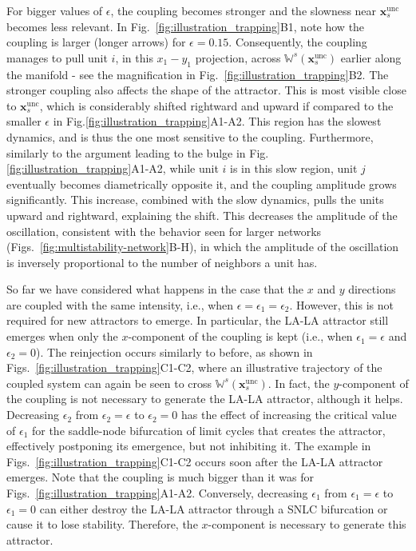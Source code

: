 For bigger values of $\epsilon$, the coupling becomes stronger and the slowness near $\mathbf{x}_s^\mathrm{unc}$ becomes less relevant. In Fig.~\ref{fig:illustration_trapping}B1, note how the coupling is larger (longer arrows) for $\epsilon = 0.15$. Consequently, the coupling manages to pull unit $i$, in this $x_1-y_1$ projection, across $\mathbb{W}^s(\mathbf{x}_s^\mathrm{unc})$ earlier along the manifold - see the magnification in Fig.~\ref{fig:illustration_trapping}B2. 
The stronger coupling also affects the shape of the attractor. This is most visible close to $\mathbf{x}_s^\mathrm{unc}$, which is considerably shifted rightward and upward if compared to the smaller $\epsilon$ in Fig.\ref{fig:illustration_trapping}A1-A2. This region has the slowest dynamics, and is thus the one most sensitive to the coupling. Furthermore, similarly to the argument leading to the bulge in Fig.\ref{fig:illustration_trapping}A1-A2, while unit $i$ is in this slow region, unit $j$ eventually becomes diametrically opposite it, and the coupling amplitude grows significantly. This increase, combined with the slow dynamics, pulls the units upward and rightward, explaining the shift. This decreases the amplitude of the oscillation, consistent with the behavior seen for larger networks (Figs.~\ref{fig:multistability-network}B-H), in which the amplitude of the oscillation is inversely proportional to the number of neighbors a unit has.

So far we have considered what happens in the case that the $x$ and $y$ directions are coupled with the same intensity, i.e., when $\epsilon = \epsilon_1 = \epsilon_2$. However, this is not required for new attractors to emerge. In particular, the LA-LA attractor still emerges when only the $x$-component of the coupling is kept (i.e., when $\epsilon_1=\epsilon$ and $\epsilon_2 = 0$). The reinjection occurs similarly to before, as shown in Figs.~\ref{fig:illustration_trapping}C1-C2, where an illustrative trajectory of the coupled system can again be seen to cross $\mathbb{W}^s(\mathbf{x}_s^\mathrm{unc})$. In fact, the $y$-component of the coupling is not necessary to generate the LA-LA attractor, although it helps. Decreasing $\epsilon_2$ from $\epsilon_2=\epsilon$ to $\epsilon_2=0$ has the effect of increasing the critical value of $\epsilon_1$ for the saddle-node bifurcation of limit cycles that creates the attractor, effectively postponing its emergence, but not inhibiting it. The example in Figs.~\ref{fig:illustration_trapping}C1-C2 occurs soon after the LA-LA attractor emerges. Note that the coupling is much bigger than it was for Figs.~\ref{fig:illustration_trapping}A1-A2. Conversely, decreasing $\epsilon_1$ from $\epsilon_1 = \epsilon$ to $\epsilon_1 = 0$ can either destroy the LA-LA attractor through a SNLC bifurcation or cause it to lose stability. Therefore, the $x$-component is necessary to generate this attractor. 

